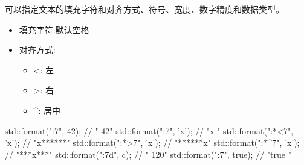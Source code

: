 可以指定文本的填充字符和对齐方式、符号、宽度、数字精度和数据类型。


\begin{itemize}
\item 
填充字符:默认空格
 
\item 
对齐方式:

\begin{itemize}
\item 
<: 左

\item 
>: 右

\item 
\^{}: 居中
\end{itemize}

\end{itemize}

\begin{cpp}
std::format("{:7}", 42);    // "     42"
std::format("{:7}", 'x');   // "x      "
std::format("{:*<7}", 'x'); // "x******"
std::format("{:*>7}", 'x'); // "******x"
std::format("{:*^7}", 'x'); // "***x***"
std::format("{:7d}", c);    // "    120"
std::format("{:7}", true);  // "true   "
\end{cpp}


